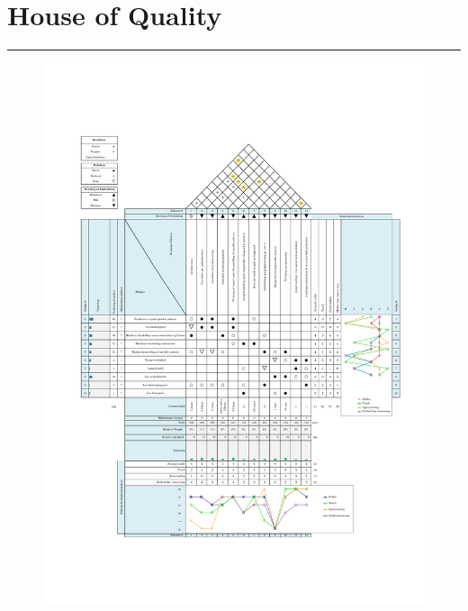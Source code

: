 \chapter{House of Quality} \label{Bilag - HOQ}

\plainbreak{-7}
\begin{figure}[H]
    \centering
    \includegraphics[width=1.\linewidth]{bilag/Media/Media/House of Quality.pdf}
\end{figure}



